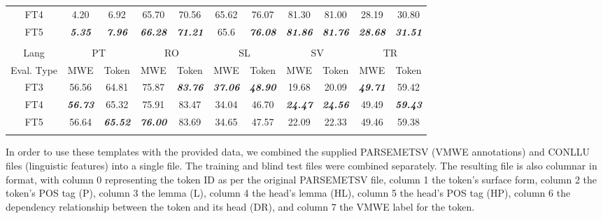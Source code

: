 \documentclass[output=paper
,modfonts
,nonflat]{langsci/langscibook}
\begin{document}
\begin{table}
{\begin{tabular}{ccccccccccc}
{\tiny{}FT4 } & {\tiny{}4.20 } & {\tiny{}6.92 } & {\tiny{}65.70 } & {\tiny{}70.56 }& {\tiny{}65.62 } & {\tiny{}76.07 } & {\tiny{}81.30 } & {\tiny{}81.00 } & \multicolumn{1}{c}{{\tiny{}28.19}} & \multicolumn{1}{c}{{\tiny{}30.80}}\tabularnewline
 
{\tiny{}FT5 } & \textbf{\emph{\tiny{}5.35}}\emph{\tiny{} } & \textbf{\emph{\tiny{}7.96}}\emph{\tiny{} } & \textbf{\emph{\tiny{}66.28}}\emph{\tiny{} } & \textbf{\emph{\tiny{}71.21}}\emph{\tiny{} }& {\tiny{}65.6 } & \textbf{\emph{\tiny{}76.08 }} & \textbf{\emph{\tiny{}81.86}}\emph{\tiny{} } & \textbf{\emph{\tiny{}81.76}}\emph{\tiny{} } & \multicolumn{1}{c}{\textbf{\emph{\tiny{}28.68}}} & \multicolumn{1}{c}{\textbf{\emph{\tiny{}31.51}}}\tabularnewline
 
\lspbottomrule
 & &&&&&&&&&  \tabularnewline
\lsptoprule
{\tiny{}Lang }& \multicolumn{2}{c}{{\tiny{}PT}} & \multicolumn{2}{c}{{\tiny{}RO}} & \multicolumn{2}{c}{{\tiny{}SL}} & \multicolumn{2}{c}{{\tiny{}SV}} & \multicolumn{2}{c}{{\tiny{}TR}}  \tabularnewline
{\tiny{}Eval. Type } & {\tiny{}MWE } & {\tiny{}Token } & {\tiny{}MWE } & {\tiny{}Token } & {\tiny{}MWE } & {\tiny{}Token } & {\tiny{}MWE } & {\tiny{}Token } & {\tiny{}MWE } & {\tiny{}Token }   \tabularnewline
\midrule
{\tiny{}FT3 } & {\tiny{}56.56 } & {\tiny{}64.81 } & {\tiny{}75.87 } & \textbf{\emph{\tiny{}83.76}}\emph{\tiny{} } & \textbf{\emph{\tiny{}37.06}}\emph{\tiny{} } & \textbf{\emph{\tiny{}48.90}}\emph{\tiny{} } & {\tiny{}19.68 } & {\tiny{}20.09 } & \textbf{\emph{\tiny{}49.71}}\emph{\tiny{} } & {\tiny{}59.42 }    \tabularnewline
{\tiny{}FT4 }  & \textbf{\emph{\tiny{}56.73}}\emph{\tiny{} } & {\tiny{}65.32 } & {\tiny{}75.91 } & {\tiny{}83.47 } & {\tiny{}34.04 } & {\tiny{}46.70 } & \textbf{\emph{\tiny{}24.47}}\emph{\tiny{} } & \textbf{\emph{\tiny{}24.56}}\emph{\tiny{} } & {\tiny{}49.49 } & \textbf{\emph{\tiny{}59.43}}{\tiny{} }   \tabularnewline
{\tiny{}FT5 }  & {\tiny{}56.64 } & \textbf{\emph{\tiny{}65.52}}{\tiny{} } & \textbf{\emph{\tiny{}76.00}}\emph{\tiny{} } & {\tiny{}83.69 } & {\tiny{}34.65 } & {\tiny{}47.57 } & {\tiny{}22.09 } & {\tiny{}22.33 } & {\tiny{}49.46 } & {\tiny{}59.38 }    \tabularnewline
\lspbottomrule
\end{tabular}
}
\end{table}

In order to use these templates with the provided data, we combined
the supplied PARSEMETSV (VMWE annotations) and CONLLU files
(linguistic features) into a single file. The training and blind test
files were combined separately. The resulting file is also columnar in
format, with column 0 representing the token ID as per the original
PARSEMETSV file, column 1 the token's surface form, column 2 the
token's POS tag (P), column 3 the lemma (L), column 4 the head's
lemma (HL), column 5 the head's POS tag (HP), column 6 the
dependency relationship between the token and its head (DR), and column 7
the VMWE label for the token. 
\end{document}
